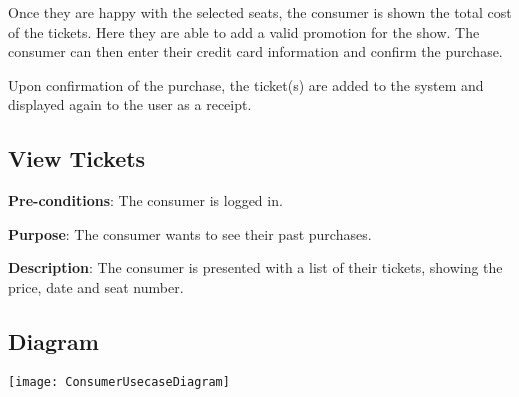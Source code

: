 Once they are happy with the selected seats, the consumer is shown the total cost of the tickets. Here they are able to add a valid promotion for the show. The consumer can then enter their credit card information and confirm the purchase.

Upon confirmation of the purchase, the ticket(s) are added to the system and displayed again to the user as a receipt.

\subsection{View Tickets}
\textbf{Pre-conditions}: The consumer is logged in.

\textbf{Purpose}: The consumer wants to see their past purchases.

\textbf{Description}: The consumer is presented with a list of their tickets, showing the price, date and seat number.

\subsection{Diagram}
\texttt{[image: ConsumerUsecaseDiagram]}
